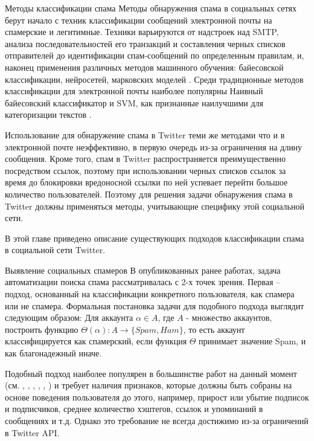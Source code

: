 
\clearpage
\begin{section}{Методы классификации спама}
Методы обнаружения спама в социальных сетях берут начало с
техник классификации сообщений электронной почты на
спамерские и легитимные.
Техники варьируются от надстроек над SMTP,
анализа последовательностей его транзакций и
составления черных списков отправителей до
идентификации спам-сообщений по определенным правилам,
и, наконец применения различных методов машинного обучения:
байесовской классификации, нейросетей, марковских моделей \cite{Caruana}.
Среди традиционные методов классификации для электронной почты
наиболее популярны Наивный байесовский классификатор и SVM,
как признанные наилучшими для категоризации текстов \cite{Almeida}.

Использование для обнаружение спама в Twitter теми же методами
что и в электронной почте неэффективно,
в первую очередь из-за ограничения на длину сообщения.
Кроме того, спам в Twitter распространяется преимущественно
посредством ссылок, поэтому при использовании черных списков
ссылок за время до блокировки вредоносной ссылки по ней успевает
перейти большое количество пользователей. Поэтому для решения
задачи обнаружения спама в Twitter должны применяться методы,
учитывающие специфику этой социальной сети.

В этой главе приведено описание существующих подходов классификации спама в социальной сети Twitter.

\begin{subsection}{Выявление социальных спамеров}
  В опубликованных ранее работах,
  задача автоматизации поиска спама рассматривалась с
  2-х точек зрения.
  Первая – подход, основанный на классификации
  конкретного пользователя, как спамера или не спамера.
  Формальная постановка задачи для подобного подхода
  выглядит следующим образом:
  Для аккаунта $\alpha \in A$, где $A$ - множество аккаунтов, построить функцию ${\Theta(\alpha): A\rightarrow\{Spam, Ham\}}$,
  то есть аккаунт классифицируется как спамерский, если функция $\Theta$ принимает значение Spam, и как благонадежный иначе.

  Подобный подход наиболее популярен в
  большинстве работ на данный момент (см. \cite{Wang}, \cite{Benevenuto}, \cite{McCord}, \cite{Lee}, \cite{Yang}, \cite{Ferrara})
  и требует наличия признаков, которые должны быть собраны на основе поведения пользователя до этого, например, прирост или убытие подписок и подписчиков, среднее количество хэштегов, ссылок и упоминаний в сообщениях и т.д.
  Однако это требование не всегда достижимо из-за ограничений в Twitter API.


\end{subsection}
\end{section}
